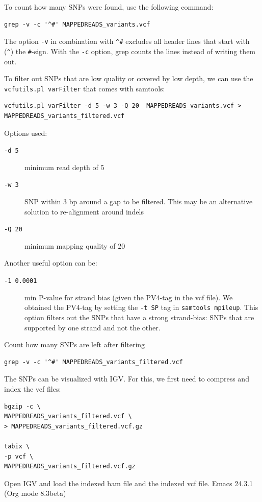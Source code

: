 \documentclass[11pt]{article}
\begin{document}
To count how many SNPs were found, use the following command:

\begin{verbatim}
grep -v -c '^#' MAPPEDREADS_variants.vcf
\end{verbatim}

The option \texttt{-v} in combination with \texttt{\textasciicircum{}\#} excludes all header lines
that start with (\texttt{\textasciicircum{}}) the \texttt{\#}-sign. With the \texttt{-c} option, grep counts
the lines instead of writing them out.


To filter out SNPs that are low quality or covered by low depth, we
can use the \texttt{vcfutils.pl varFilter} that comes with samtools:

\begin{verbatim}
vcfutils.pl varFilter -d 5 -w 3 -Q 20  MAPPEDREADS_variants.vcf > MAPPEDREADS_variants_filtered.vcf
\end{verbatim}


Options used:
\begin{description}
\item[{\texttt{-d 5}}] minimum read depth of 5
\item[{\texttt{-w 3}}] SNP within 3 bp around a gap to be filtered. This may be
an alternative solution to re-alignment around indels
\item[{\texttt{-Q 20}}] minimum mapping quality of 20
\end{description}

Another useful option can be:
\begin{description}
\item[{\texttt{-1 0.0001}}] min P-value for strand bias (given the PV4-tag in the
vcf file). We obtained the PV4-tag by setting the \texttt{-t SP} tag in
\texttt{samtools mpileup}. This option filters out the SNPs that have a
strong strand-bias: SNPs that are supported by one strand and not
the other.
\end{description}


Count how many SNPs are left after filtering

\begin{verbatim}
grep -v -c '^#' MAPPEDREADS_variants_filtered.vcf
\end{verbatim}

The SNPs can be visualized with IGV. For this, we first need to
compress and index the vcf files: 

\begin{verbatim}
bgzip -c \
MAPPEDREADS_variants_filtered.vcf \
> MAPPEDREADS_variants_filtered.vcf.gz

tabix \
-p vcf \
MAPPEDREADS_variants_filtered.vcf.gz
\end{verbatim}

Open IGV and load the indexed bam file and the indexed vcf file.
Emacs 24.3.1 (Org mode 8.3beta)
\end{document}
